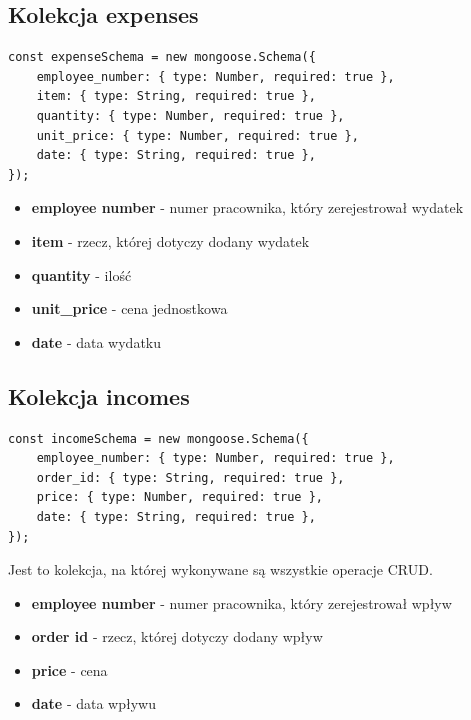 \documentclass[12pt]{article}
\begin{document}
\newpage
\begin{samepage}
\subsection{Kolekcja expenses}
\begin{lstlisting}[caption={Expenses}]
const expenseSchema = new mongoose.Schema({
	employee_number: { type: Number, required: true },
	item: { type: String, required: true },
	quantity: { type: Number, required: true },
	unit_price: { type: Number, required: true },
	date: { type: String, required: true },
});
\end{lstlisting}
\end{samepage}

\begin{itemize}
	\item \textbf{employee number} - numer pracownika, który zerejestrował wydatek
	\item \textbf{item} - rzecz, której dotyczy dodany wydatek
	\item \textbf{quantity} - ilość 
	\item \textbf{unit\_price} - cena jednostkowa
	\item \textbf{date} - data wydatku
\end{itemize}

\newpage
\begin{samepage}
\subsection{Kolekcja incomes}
\begin{lstlisting}[caption={Incomes}]
const incomeSchema = new mongoose.Schema({
    employee_number: { type: Number, required: true },
    order_id: { type: String, required: true },
    price: { type: Number, required: true },
    date: { type: String, required: true },
});
\end{lstlisting}
Jest to kolekcja, na której wykonywane są wszystkie operacje CRUD.
\end{samepage}

\begin{itemize}
	\item \textbf{employee number} - numer pracownika, który zerejestrował wpływ
	\item \textbf{order id} - rzecz, której dotyczy dodany wpływ
	\item \textbf{price} - cena
	\item \textbf{date} - data wpływu
\end{itemize}
\end{document}
